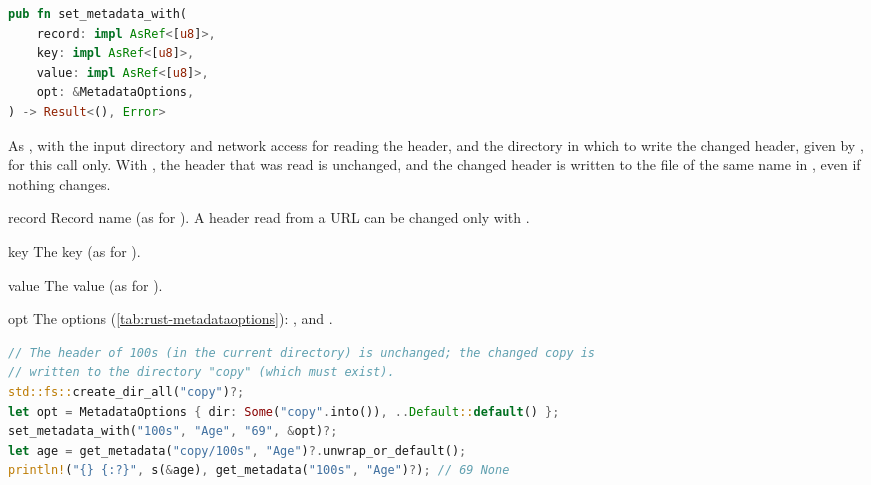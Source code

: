 \begin{lstlisting}[language=Rust,style=signature]
pub fn set_metadata_with(
    record: impl AsRef<[u8]>,
    key: impl AsRef<[u8]>,
    value: impl AsRef<[u8]>,
    opt: &MetadataOptions,
) -> Result<(), Error>
\end{lstlisting}
As , with the input directory and network access for reading the
header, and the directory  in which to write the changed header, given by
, for this call only. With , the header that was read is unchanged,
and the changed header is written to the file of the same name in , even if
nothing changes.
\begin{params}
\item[record] Record name (as for ). A header read from a URL can be
  changed only with .
\item[key] The key (as for ).
\item[value] The value (as for ).
\item[opt] The options (\cref{tab:rust-metadataoptions}): ,
   and .
\end{params}
\begin{lstlisting}[language=Rust,style=example]
// The header of 100s (in the current directory) is unchanged; the changed copy is
// written to the directory "copy" (which must exist).
std::fs::create_dir_all("copy")?;
let opt = MetadataOptions { dir: Some("copy".into()), ..Default::default() };
set_metadata_with("100s", "Age", "69", &opt)?;
let age = get_metadata("copy/100s", "Age")?.unwrap_or_default();
println!("{} {:?}", s(&age), get_metadata("100s", "Age")?); // 69 None
\end{lstlisting}

